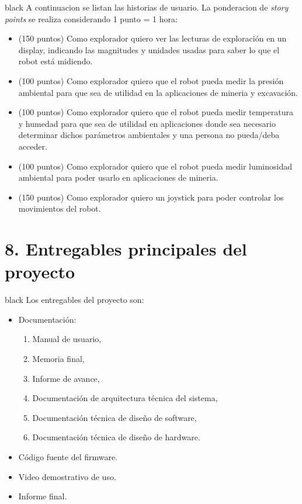 \documentclass[
11pt, %
]{charter}
\begin{document}
\begin{consigna}{black}
A continuacion se listan las historias de usuario. La ponderacion de \textit{story points} se realiza considerando 1 punto = 1 hora:
\begin{itemize}
	\item (150 puntos) Como explorador quiero ver las lecturas de exploración en un display, indicando las magnitudes y unidades usadas para saber lo que el robot está midiendo.
	\item (100 puntos) Como explorador quiero que el robot pueda medir la presión ambiental para que sea de utilidad en la aplicaciones de mineria y excavación.
	\item (100 puntos) Como explorador quiero que el robot pueda medir temperatura y humedad para que sea de utilidad en aplicaciones donde sea necesario determinar dichos parámetros ambientales y una persona no pueda/deba acceder.
	\item (100 puntos) Como explorador quiero que el robot pueda medir luminosidad ambiental para poder usarlo en aplicaciones de mineria.
	\item (150 puntos) Como explorador quiero un joystick para poder controlar los movimientos del robot.
\end{itemize}
\end{consigna}

\section{8. Entregables principales del proyecto}
\label{sec:entregables}
\begin{consigna}{black}
Los entregables del proyecto son:
\begin{itemize}
	\item Documentación:
	\begin{enumerate}				
		\item Manual de usuario,			
		\item Memoria final,
		\item Informe de avance,
		\item Documentación de arquitectura técnica del sistema,
		\item Documentación técnica de diseño de software,
		\item Documentación técnica de diseño de hardware.						
	\end{enumerate}	
	\item Código fuente del firmware.
	\item Video demostrativo de uso. 
	\item Informe final.
\end{itemize}
\end{consigna}
\end{document}
